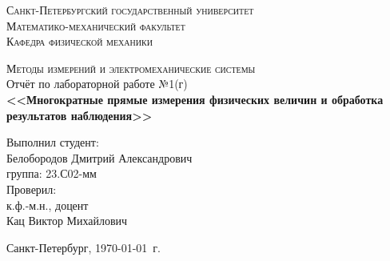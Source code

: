 \begin{titlepage}
\begin{center}
\textsc{Санкт-Петербургский государственный университет\\
Математико-механический факультет\\
Кафедра физической механики\\}

\vfill

\textsc{Методы измерений и электромеханические системы\\[3mm]}
Отчёт по лабораторной работе №1(г)\\[6mm]


\textbf{\large<<Многократные прямые измерения физических величин и обработка результатов наблюдения>>}

\vfill
\end{center}

\hfill
\begin{minipage}{.5\textwidth}
Выполнил студент:\\[2mm] 
Белобородов Дмитрий Александрович\\
группа: 23.С02-мм\\[5mm]

Проверил:\\[2mm] 
к.ф.-м.н., доцент\\
Кац Виктор Михайлович
\end{minipage}%
\vfill
\begin{center}
 Санкт-Петербург, \yeardate\today\ г.
\end{center}
\end{titlepage}